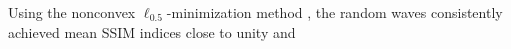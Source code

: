 Using
the nonconvex $\ell_{0.5}$-minimization method
,
the random waves consistently achieved
%
mean \ac{SSIM} indices close to
unity and
%

